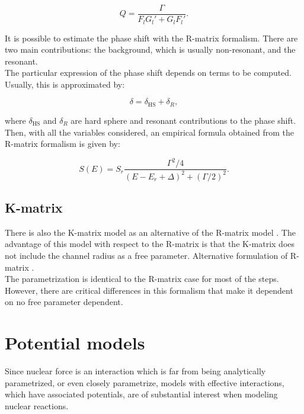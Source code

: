 \documentclass[openany]{book}
\begin{document}
\begin{equation} \label{eq:rmatrix_QFactor}
	Q = \frac{\Gamma}{F_lG_l' + G_lF_l'}.
\end{equation}

It is possible to estimate the phase shift with the R-matrix formalism. There are two main contributions: the background, which is usually non-resonant, and the resonant. \\

The particular expression of the phase shift depends on terms to be computed. Usually, this is approximated by:

\begin{equation}  \label{eq:rmatrix_phaseShift}
	\delta = \delta_{\mathrm{HS}} + \delta_R,
\end{equation}

where $\delta_{\mathrm{HS}}$ and $\delta_R$ are hard sphere and resonant contributions to the phase shift. \\

Then, with all the variables considered, an empirical formula obtained from the R-matrix formalism is given by:

\begin{equation} \label{eq:rmatrix_sfactor}
	S(E) = S_r \frac{\Gamma^2/4}{(E-E_r + \Delta)^2 + (\Gamma/2)^2}.
\end{equation}

\subsection{K-matrix} \label{sub:kmatrix}

There is also the K-matrix model as an alternative of the R-matrix model \cite{humblet_1990}. The advantage of this model with respect to the R-matrix is that the K-matrix does not include the channel radius as a free parameter.  Alternative formulation of R-matrix \cite{brune_2002}. \\

The parametrization is identical to the R-matrix case for most of the steps. However, there are critical differences in this formalism that make it dependent on no free parameter dependent. 

\section{Potential models} \label{sec:potentialModels}


Since nuclear force is an interaction which is far from being analytically parametrized, or even closely parametrize, models with effective interactions, which have associated potentials, are of substantial interest when modeling nuclear reactions.  \\
\end{document}
